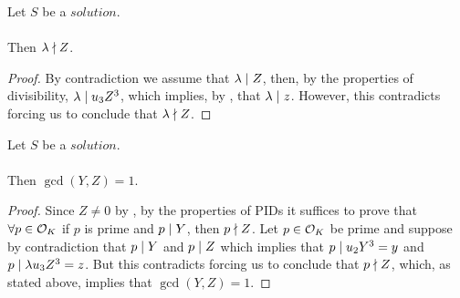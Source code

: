 \begin{lemma}
    \label{lmm:lambda_not_dvd_Z}
    \leanok
    Let $S$ be a $solution$.\\\\
    Then $\lambda \nmid Z$.
\end{lemma}
\begin{proof}
    \leanok
    By contradiction we assume that $\lambda \mid Z$, then, by the properties of divisibility,
    $\lambda \mid u_3 Z^3$, which implies, by ,
    that $\lambda \mid z$.
    However, this contradicts 
    forcing us to conclude that $\lambda \nmid Z$.
\end{proof}

\begin{lemma}
    \label{lmm:coprime_Y_Z}
    \leanok
    Let $S$ be a $solution$.\\\\
    Then $\gcd(Y, Z) = 1$.
\end{lemma}
\begin{proof}
    \leanok
    Since $Z \neq 0$ by , by the properties of PIDs it suffices to prove that
    $\forall p \in \mathcal{O}_K$ if $p$ is prime and $p \mid Y$, then $p \nmid Z$.
    Let $p \in \mathcal{O}_K$ be prime and suppose by contradiction that $p \mid Y$ and $p \mid Z$
    which implies that $p \mid u_2 Y^3 = y$ and $p \mid \lambda u_3 Z^3 = z$.
    But this contradicts  forcing us to conclude that $p \nmid Z$, which,
    as stated above, implies that $\gcd(Y,Z)=1$.
\end{proof}

